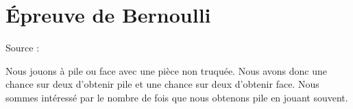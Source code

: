 
\section{Épreuve de Bernoulli}

Source : \cite{YDRqwN}

Nous jouons à pile ou face avec une pièce non truquée. Nous avons donc une chance sur deux d'obtenir pile et une chance sur deux d'obtenir face. Nous sommes intéressé par le nombre de fois que nous obtenons pile en jouant souvent.


